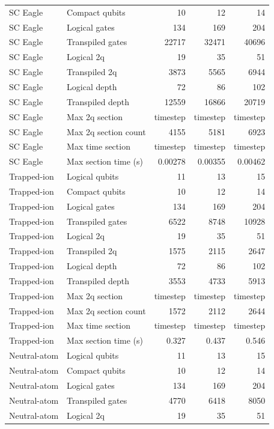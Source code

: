 \begin{table}
\begin{tabular}{llrrr}
SC Eagle & Compact qubits & 10 & 12 & 14 \\
SC Eagle & Logical gates & 134 & 169 & 204 \\
SC Eagle & Transpiled gates & 22717 & 32471 & 40696 \\
SC Eagle & Logical 2q & 19 & 35 & 51 \\
SC Eagle & Transpiled 2q & 3873 & 5565 & 6944 \\
SC Eagle & Logical depth & 72 & 86 & 102 \\
SC Eagle & Transpiled depth & 12559 & 16866 & 20719 \\
SC Eagle & Max 2q section & timestep & timestep & timestep \\
SC Eagle & Max 2q section count & 4155 & 5181 & 6923 \\
SC Eagle & Max time section & timestep & timestep & timestep \\
SC Eagle & Max section time (s) & 0.00278 & 0.00355 & 0.00462 \\
\hline
Trapped-ion & Logical qubits & 11 & 13 & 15 \\
Trapped-ion & Compact qubits & 10 & 12 & 14 \\
Trapped-ion & Logical gates & 134 & 169 & 204 \\
Trapped-ion & Transpiled gates & 6522 & 8748 & 10928 \\
Trapped-ion & Logical 2q & 19 & 35 & 51 \\
Trapped-ion & Transpiled 2q & 1575 & 2115 & 2647 \\
Trapped-ion & Logical depth & 72 & 86 & 102 \\
Trapped-ion & Transpiled depth & 3553 & 4733 & 5913 \\
Trapped-ion & Max 2q section & timestep & timestep & timestep \\
Trapped-ion & Max 2q section count & 1572 & 2112 & 2644 \\
Trapped-ion & Max time section & timestep & timestep & timestep \\
Trapped-ion & Max section time (s) & 0.327 & 0.437 & 0.546 \\
\hline
Neutral-atom & Logical qubits & 11 & 13 & 15 \\
Neutral-atom & Compact qubits & 10 & 12 & 14 \\
Neutral-atom & Logical gates & 134 & 169 & 204 \\
Neutral-atom & Transpiled gates & 4770 & 6418 & 8050 \\
Neutral-atom & Logical 2q & 19 & 35 & 51 \\

\end{tabular}
\end{table}
